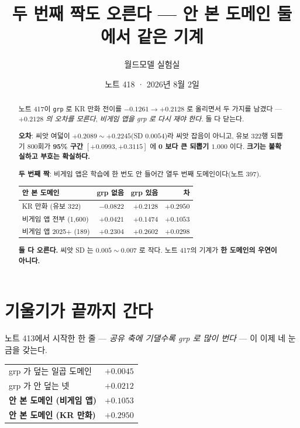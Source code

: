 \documentclass[11pt]{article}
\begin{document}
\title{두 번째 짝도 오른다 --- 안 본 도메인 둘에서 같은 기계}
\author{월드모델 실험실}
\date{노트 418 · 2026년 8월 2일}
\maketitle

\begin{abstract}
노트 417이 \texttt{grp} 로 KR 만화 전이를 $-0.1261 \to +0.2128$ 로 올리면서
두 가지를 남겼다 --- \emph{$+0.2128$ 의 오차를 모른다}, \emph{비게임 앱을
grp 로 다시 재야 한다}. 둘 다 닫는다.

\textbf{오차}: 씨앗 여덟이 $+0.2089 \sim +0.2245$(SD $0.0054$)라 씨앗 잡음이
아니고, 유보 322행 되뽑기 800회가 \textbf{95\% 구간
$[+0.0993, +0.3115]$} 에 \textbf{0 보다 큰 되뽑기 $1.000$} 이다.
\textbf{크기는 불확실하고 부호는 확실하다.}

\textbf{두 번째 짝}: 비게임 앱은 학습에 한 번도 안 들어간 열두 번째
도메인이다(노트 397).

\begin{center}
\begin{tabular}{lrrr}
\hline
안 본 도메인 & grp 없음 & \textbf{grp 있음} & 차 \\
\hline
KR 만화 (유보 322) & $-0.0822$ & $\mathbf{+0.2128}$ & $+0.2950$ \\
비게임 앱 전부 (1{,}600) & $+0.0421$ & $\mathbf{+0.1474}$ & $+0.1053$ \\
비게임 앱 2025$+$ (189) & $+0.2304$ & $\mathbf{+0.2602}$ & $+0.0298$ \\
\hline
\end{tabular}
\end{center}

\textbf{둘 다 오른다.} 씨앗 SD 는 $0.005 \sim 0.007$ 로 작다. 노트 417의
기계가 \textbf{한 도메인의 우연이 아니다.}
\end{abstract}

\section{기울기가 끝까지 간다}

노트 413에서 시작한 한 줄 --- \emph{공유 축에 기댈수록 grp 로 많이 번다}
--- 이 이제 네 눈금을 갖는다.

\begin{center}
\begin{tabular}{lr}
\hline
grp 가 덮는 일곱 도메인 & $+0.0045$ \\
grp 가 안 덮는 넷 & $+0.0212$ \\
\textbf{안 본 도메인 (비게임 앱)} & $\mathbf{+0.1053}$ \\
\textbf{안 본 도메인 (KR 만화)} & $\mathbf{+0.2950}$ \\
\hline
\end{tabular}
\end{center}
\end{document}
